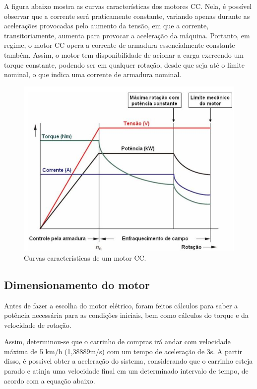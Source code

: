 \par A figura abaixo mostra as curvas características dos motores CC. Nela, é possível observar que a corrente será praticamente constante, variando apenas durante as acelerações provocadas pelo aumento da tensão, em que a corrente, transitoriamente, aumenta para provocar a aceleração da máquina. Portanto, em regime, o motor CC opera a corrente de armadura essencialmente constante também. Assim, o motor tem disponibilidade de acionar a carga exercendo um torque constante, podendo ser em qualquer rotação, desde que seja até o limite nominal, o que indica uma corrente de armadura nominal. \cite{prentice}
\begin{figure}[ht]
		\centering
		\includegraphics[width=1\textwidth]{figuras/curvamotorcc.JPG}
		\caption{Curvas características de um motor CC.  \cite{prentice}}
		\label{fig:curvamotorcc}
\end{figure} 


\subsection{Dimensionamento do motor}
\par Antes de fazer a escolha do motor elétrico, foram feitos cálculos para saber a potência necessária para as condições iniciais, bem como cálculos do torque e da velocidade de rotação. 
\par Assim, determinou-se que o carrinho de compras irá andar com velocidade máxima de 5 km/h (1,38889m/s) com um tempo de aceleração de 3s. A partir disso, é possível obter a aceleração do sistema, considerando que o carrinho esteja parado e atinja uma velocidade final em um determinado intervalo de tempo, de acordo com a equação abaixo.

